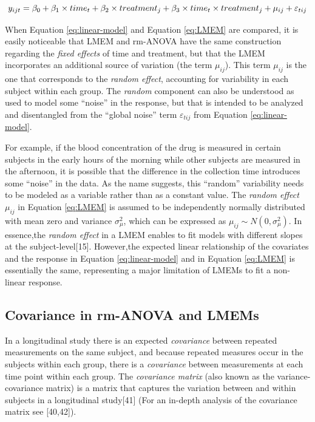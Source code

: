 \documentclass[
]{article}
\begin{document}
\begin{equation}
y_{ijt} = \beta_0+ \beta_1 \times time_{t} + \beta_2 \times treatment_{j} + \beta_3 \times time_{t}\times treatment_{j}+\mu_{ij} +\varepsilon_{tij}\\ 
\label{eq:LMEM}
\end{equation}

When Equation \eqref{eq:linear-model} and Equation \eqref{eq:LMEM} are compared, it is easily noticeable that LMEM and rm-ANOVA have the same construction regarding the \emph{fixed effects} of time and treatment, but that the LMEM incorporates an additional source of variation (the term \(\mu_{ij}\)). This term \(\mu_{ij}\) is the one that corresponds to the \emph{random effect}, accounting for variability in each subject within each group. The \emph{random} component can also be understood as used to model some ``noise'' in the response, but that is intended to be analyzed and disentangled from the ``global noise'' term \(\varepsilon_{tij}\) from Equation \eqref{eq:linear-model}.

For example, if the blood concentration of the drug is measured in certain subjects in the early hours of the morning while other subjects are measured in the afternoon, it is possible that the difference in the collection time introduces some ``noise'' in the data. As the name suggests, this ``random'' variability needs to be modeled as a variable rather than as a constant value. The \emph{random effect} \(\mu_{ij}\) in Equation \eqref{eq:LMEM} is assumed to be independently normally distributed with mean zero and variance \(\sigma^2_\mu\), which can be expressed as \(\mu_{ij} \sim N(0,\sigma^2_\mu)\). In essence,the \emph{random effect} in a LMEM enables to fit models with different slopes at the subject-level{[}15{]}. However,the expected linear relationship of the covariates and the response in Equation \eqref{eq:linear-model} and in Equation \eqref{eq:LMEM} is essentially the same, representing a major limitation of LMEMs to fit a non-linear response.

\hypertarget{covariance-in-rm-anova-and-lmems}{%
\subsection{Covariance in rm-ANOVA and LMEMs}\label{covariance-in-rm-anova-and-lmems}}

In a longitudinal study there is an expected \emph{covariance} between repeated measurements on the same subject, and because repeated measures occur in the subjects within each group, there is a \emph{covariance} between measurements at each time point within each group. The \emph{covariance matrix} (also known as the variance-covariance matrix) is a matrix that captures the variation between and within subjects in a longitudinal study{[}41{]} (For an in-depth analysis of the covariance matrix see {[}40,42{]}).
\end{document}
